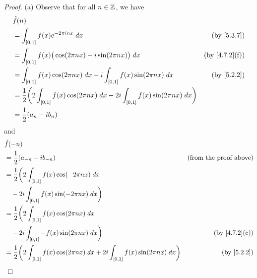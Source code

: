 \begin{proof}{(a)}
  Observe that for all \(n \in \mathbb{Z}\), we have
  \begin{align*}
     & \hat{f}(n)                                                                                                                                       \\
     & = \int_{[0, 1]} f(x) e^{- 2 \pi i n x} \; dx                                                                       & \text{(by \cref{5.3.7})}    \\
     & = \int_{[0, 1]} f(x) \big(\cos(2 \pi n x) - i \sin(2 \pi n x)\big) \; dx                                           & \text{(by \cref{4.7.2}(f))} \\
     & = \int_{[0, 1]} f(x) \cos(2 \pi n x) \; dx - i \int_{[0, 1]} f(x) \sin(2 \pi n x) \; dx                            & \text{(by \cref{5.2.2})}    \\
     & = \frac{1}{2} \bigg(2 \int_{[0, 1]} f(x) \cos(2 \pi n x) \; dx - 2i \int_{[0, 1]} f(x) \sin(2 \pi n x) \; dx\bigg)                               \\
     & = \frac{1}{2} (a_n - i b_n)
  \end{align*}
  and
  \begin{align*}
     & \hat{f}(-n)                                                                                                                                        \\
     & = \frac{1}{2} (a_{-n} - i b_{-n})                                                                                  & \text{(from the proof above)} \\
     & = \frac{1}{2} \bigg(2 \int_{[0, 1]} f(x) \cos(- 2 \pi n x) \; dx                                                                                   \\
     & \quad - 2i \int_{[0, 1]} f(x) \sin(- 2 \pi n x) \; dx\bigg)                                                                                        \\
     & = \frac{1}{2} \bigg(2 \int_{[0, 1]} f(x) \cos(2 \pi n x) \; dx                                                                                     \\
     & \quad - 2i \int_{[0, 1]} -f(x) \sin(2 \pi n x) \; dx\bigg)                                                         & \text{(by \cref{4.7.2}(c))}   \\
     & = \frac{1}{2} \bigg(2 \int_{[0, 1]} f(x) \cos(2 \pi n x) \; dx + 2i \int_{[0, 1]} f(x) \sin(2 \pi n x) \; dx\bigg) & \text{(by \cref{5.2.2})}      \\

\end{align*}
\end{proof}
